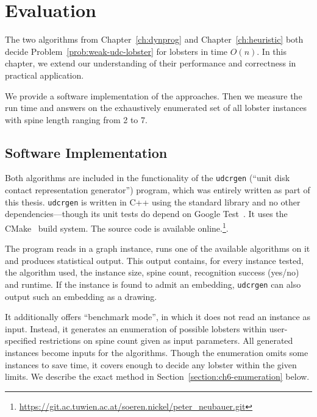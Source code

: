 \chapter{Evaluation}

The two algorithms from Chapter~\ref{ch:dynprog} and Chapter~\ref{ch:heuristic} both decide Problem~\ref{prob:weak-udc-lobster} for lobsters in time $O(n)$. In this chapter, we extend our understanding of their performance and correctness in practical application.

We provide a software implementation of the approaches. Then we measure the run time and answers on the exhaustively enumerated set of all lobster instances with spine length ranging from 2 to 7.

\section{Software Implementation}

Both algorithms are included in the functionality of the \texttt{udcrgen} (``unit disk contact representation generator'') program, which was entirely written as part of this thesis. \texttt{udcrgen} is written in C++ using the standard library and no other dependencies---though its unit tests do depend on Google Test~\cite{GoogleTest}. It uses the CMake~\cite{CMake} build system. The source code is available online.\footnote{\url{https://git.ac.tuwien.ac.at/soeren.nickel/peter_neubauer.git}}.

The program reads in a graph instance, runs one of the available algorithms on it and produces statistical output. This output contains, for every instance tested, the algorithm used, the instance size, spine count, recognition success (yes/no) and runtime.  If the instance is found to admit an embedding, \texttt{udcrgen} can also output such an embedding as a drawing.

It additionally offers ``benchmark mode'', in which it does not read an instance as input. Instead, it generates an enumeration of possible lobsters within user-specified restrictions on spine count given as input parameters. All generated instances become inputs for the algorithms. Though the enumeration omits some instances to save time, it covers enough to decide any lobster within the given limits. We describe the exact method in Section~\ref{section:ch6-enumeration} below. 

